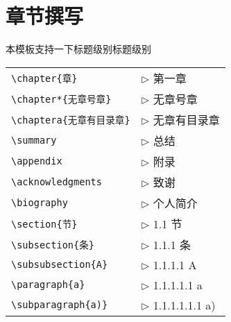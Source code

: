 \section{章节撰写}
本模板支持一下标题级别标题级别

\begin{tabular}{ll}
  \verb|\chapter{章}|              & $\triangleright$ 第一章 \\
  \verb|\chapter*{无章号章}|       & $\triangleright$ 无章号章 \\
  \verb|\chaptera{无章有目录章}|   & $\triangleright$ 无章有目录章 \\
  \verb|\summary|                  & $\triangleright$ 总结\\
  \verb|\appendix|                 & $\triangleright$ 附录\\
  \verb|\acknowledgments|          & $\triangleright$ 致谢\\
  \verb|\biography|                & $\triangleright$ 个人简介\\
  \verb|\section{节}|              & $\triangleright$ 1.1 节\\
  \verb|\subsection{条}|           & $\triangleright$ 1.1.1 条\\
  \verb|\subsubsection{A}|         & $\triangleright$ 1.1.1.1 A\\
  \verb|\paragraph{a}|             & $\triangleright$ 1.1.1.1.1 a\\
  \verb|\subparagraph{a)}|         & $\triangleright$ 1.1.1.1.1.1 a)\\
\end{tabular}

